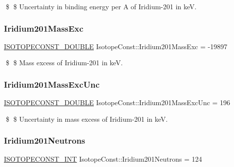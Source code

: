 \$ \$ Uncertainty in binding energy per A of Iridium-\/201 in keV. \mbox{\label{group___isotope_const-_iridium-_ir201_ga2f95c5faa43d530bd7a968d6a9738d9c}} 
\subsubsection{\texorpdfstring{Iridium201\+Mass\+Exc}{Iridium201MassExc}}
{\footnotesize\ttfamily \mbox{\hyperlink{group___isotope_const-_macros_ga8f45a7272ce02c0b4c65c44636ed719a}{I\+S\+O\+T\+O\+P\+E\+C\+O\+N\+S\+T\+\_\+\+D\+O\+U\+B\+LE}} Isotope\+Const\+::\+Iridium201\+Mass\+Exc = -\/19897}

\$ \$ Mass excess of Iridium-\/201 in keV. \mbox{\label{group___isotope_const-_iridium-_ir201_ga8fa67be2537c5d453c54260ada440600}} 
\subsubsection{\texorpdfstring{Iridium201\+Mass\+Exc\+Unc}{Iridium201MassExcUnc}}
{\footnotesize\ttfamily \mbox{\hyperlink{group___isotope_const-_macros_ga8f45a7272ce02c0b4c65c44636ed719a}{I\+S\+O\+T\+O\+P\+E\+C\+O\+N\+S\+T\+\_\+\+D\+O\+U\+B\+LE}} Isotope\+Const\+::\+Iridium201\+Mass\+Exc\+Unc = 196}

\$ \$ Uncertainty in mass excess of Iridium-\/201 in keV. \mbox{\label{group___isotope_const-_iridium-_ir201_gab2da117dd2b9a5dacf95fcad4fe2991d}} 
\subsubsection{\texorpdfstring{Iridium201\+Neutrons}{Iridium201Neutrons}}
{\footnotesize\ttfamily \mbox{\hyperlink{group___isotope_const-_macros_ga5f18360b3e99483a35c32d789e62621c}{I\+S\+O\+T\+O\+P\+E\+C\+O\+N\+S\+T\+\_\+\+I\+NT}} Isotope\+Const\+::\+Iridium201\+Neutrons = 124}

